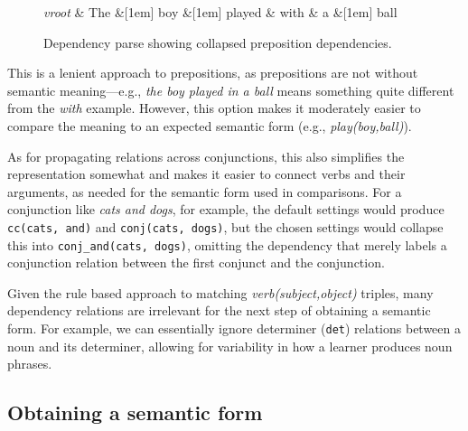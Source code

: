 \begin{figure}[htb!]
\begin{center}
    \begin{dependency}[arc edge,text only label,label style={above}]
    \begin{deptext}[column sep=.5em]
      \textit{vroot} \& The \&[1em] boy \&[1em] played \& with \& a \&[1em] ball \\
    \end{deptext}
  \end{dependency}
\end{center}
\caption{Dependency parse showing collapsed preposition dependencies.}
\label{fig:prep-dependency}
\end{figure}

This is a lenient approach to prepositions, as prepositions
are not without semantic meaning---e.g., \textit{the boy played in a
  ball} means something quite different from the \textit{with} example.  However, this option makes it moderately easier to compare the meaning to an expected semantic form (e.g., \textit{play(boy,ball)}).

As for propagating relations across conjunctions, this also simplifies the representation somewhat and makes it easier to connect verbs and their arguments, as needed for the semantic
form used in comparisons. For a conjunction like \textit{cats and dogs}, for example, the default settings would produce \texttt{cc(cats, and)} and \texttt{conj(cats, dogs)}, but the chosen settings would collapse this into \texttt{conj\_and(cats, dogs)}, omitting the dependency that merely labels a conjunction relation between the first conjunct and the conjunction.

Given the rule based approach to matching \textit{verb(subject,object)} triples, many dependency relations are irrelevant for the next step of obtaining a semantic form.  For example, we can
essentially ignore determiner (\texttt{det}) relations between a noun
and its determiner, allowing for variability in how a learner produces
noun phrases. 

\subsection{Obtaining a semantic form}
\label{sec:semantic-form}

